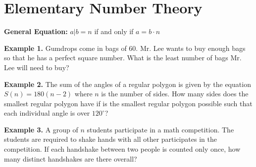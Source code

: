 \section{Elementary Number Theory}

\bigskip
\textbf{General Equation:} $a|b=n$ if and only if $a=b\cdot n$

\vfill
\textbf{Example 1.} Gumdrops come in bags of 60. Mr. Lee wants to buy enough bags so that he has a perfect square number. What is the least number of bags Mr. Lee will need to buy?

\vfill
\textbf{Example 2.} The sum of the angles of a regular polygon is given by the equation $S(n)=180(n-2)$ where $n$ is the number of sides. How many sides does the smallest regular polygon have if is the smallest regular polygon possible such that each individual angle is over $120^\circ$?

\vfill
\textbf{Example 3.} A group of $n$ students participate in a math competition. The students are required to shake hands with all other participates in the competition. If each handshake between two people is counted only once, how many distinct handshakes are there overall?

